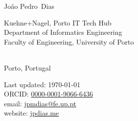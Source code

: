 \documentclass[10pt, a4paper]{article}
\makeatletter
\newcommand{\FEUP}{Faculty of Engineering, University of Porto}
\newcommand{\FirstName}{João Pedro}
\newcommand{\LastName}{Dias}
\newcommand{\MyName}{\FirstName\ \LastName}
\newcommand{\Email}{jpmdias@fe.up.pt}
\newcommand{\Website}{jpdias.me}
\newcommand{\ORCID}{0000-0001-9066-6436}
\newcommand{\Affiliation}{
    \adforn{10} Kuehne$+$Nagel, Porto IT Tech Hub\\
    \adforn{10} Department of Informatics Engineering
    \\
    \FEUP
}
\newcommand{\Address}{Porto, Portugal}
\makeatother
\begin{document}
\thispagestyle{firststyle}

{\color{awesome}\fontsize{24pt}{0}\selectfont\MyName \hfill {}}\\

\begin{minipage}[t]{0.595\textwidth}
	\Affiliation
	\\
	\Address
\end{minipage}
\begin{minipage}[t]{0.4\textwidth}
	\begin{flushright}
		Last updated: \monthyear\today
		\\
		ORCID: \href{https://orcid.org/\ORCID}{\ORCID}
		\\
		email: \href{mailto:\Email}{\Email}
		\\
		website: \href{https://\Website}{\Website}
	\end{flushright}
\end{minipage}
\begin{center}
	\color{awesome} 
	\vspace{-0.65cm}
\end{center}
\end{document}
